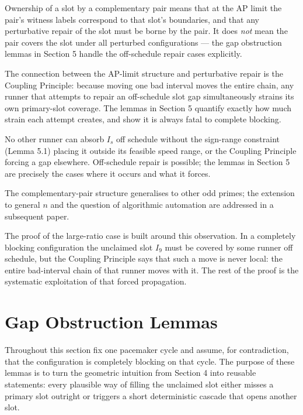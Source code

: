 \documentclass[12pt]{article}
\begin{document}
\begin{remark}\label{rem:43}
Ownership of a slot by a complementary pair means that at the AP limit the pair's
witness labels correspond to that slot's boundaries, and that any perturbative repair
of the slot must be borne by the pair. It does \emph{not} mean the pair covers the slot under
all perturbed configurations --- the gap obstruction lemmas in Section 5 handle the
off-schedule repair cases explicitly.

The connection between the AP-limit structure and perturbative repair is the Coupling
Principle: because moving one bad interval moves the entire chain, any runner that
attempts to repair an off-schedule slot gap simultaneously strains its own primary-slot
coverage. The lemmas in Section 5 quantify exactly how much strain each attempt
creates, and show it is always fatal to complete blocking.

No other runner can absorb $I_s$ off schedule without the sign-range constraint
(Lemma 5.1) placing it outside its feasible speed range, or the Coupling Principle
forcing a gap elsewhere. Off-schedule repair is possible; the lemmas in Section 5 are
precisely the cases where it occurs and what it forces.

\end{remark}

\begin{remark}\label{rem:44}
The complementary-pair structure generalises to other odd primes; the
extension to general $n$ and the question of algorithmic automation are addressed in a
subsequent paper.
\end{remark}
The proof of the large-ratio case is built around this observation. In a completely blocking
configuration the unclaimed slot $I_9$ must be covered by some runner off schedule, but
the Coupling Principle says that such a move is never local: the entire bad-interval chain
of that runner moves with it. The rest of the proof is the systematic exploitation of that
forced propagation.



\section{Gap Obstruction Lemmas}

Throughout this section fix one pacemaker cycle and assume, for contradiction, that the
configuration is completely blocking on that cycle. The purpose of these lemmas is to turn
the geometric intuition from Section 4 into reusable statements: every plausible way of
filling the unclaimed slot either misses a primary slot outright or triggers a short
deterministic cascade that opens another slot.
\end{document}
